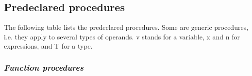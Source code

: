 \subsection{Predeclared procedures}\label{o2r:predecl:proc}

The following table lists the predeclared procedures. Some are generic
procedures, i.e. they apply to several types of operands. v stands
for a variable, x and n for expressions, and T for a type.

\subsubsection{\em Function procedures}\label{o2r:std:func}

